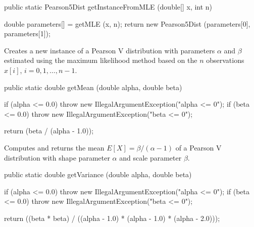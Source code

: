 \begin{htmlonly}
\end{htmlonly}
\begin{code}

   public static Pearson5Dist getInstanceFromMLE (double[] x, int n)\begin{hide} {
      double parameters[] = getMLE (x, n);
      return new Pearson5Dist (parameters[0], parameters[1]);
   }\end{hide}
\end{code}
\begin{tabb}
   Creates a new instance of a Pearson V distribution with parameters $\alpha$
   and $\beta$ estimated using the maximum likelihood method based on the $n$
   observations $x[i]$, $i = 0, 1, \ldots, n-1$.
\end{tabb}
\begin{htmlonly}
\end{htmlonly}
\begin{code}

   public static double getMean (double alpha, double beta)\begin{hide} {
      if (alpha <= 0.0)
         throw new IllegalArgumentException("alpha <= 0");
      if (beta <= 0.0)
         throw new IllegalArgumentException("beta <= 0");

      return (beta / (alpha - 1.0));
   }\end{hide}
\end{code}
\begin{tabb}
   Computes and returns the mean $E[X] = \beta / (\alpha - 1)$ of a Pearson V
   distribution with shape parameter $\alpha$ and scale parameter $\beta$.
\end{tabb}
\begin{code}

   public static double getVariance (double alpha, double beta)\begin{hide} {
      if (alpha <= 0.0)
         throw new IllegalArgumentException("alpha <= 0");
      if (beta <= 0.0)
         throw new IllegalArgumentException("beta <= 0");

      return ((beta * beta) / ((alpha - 1.0) * (alpha - 1.0) * (alpha - 2.0)));
   }\end{hide}
\end{code}
